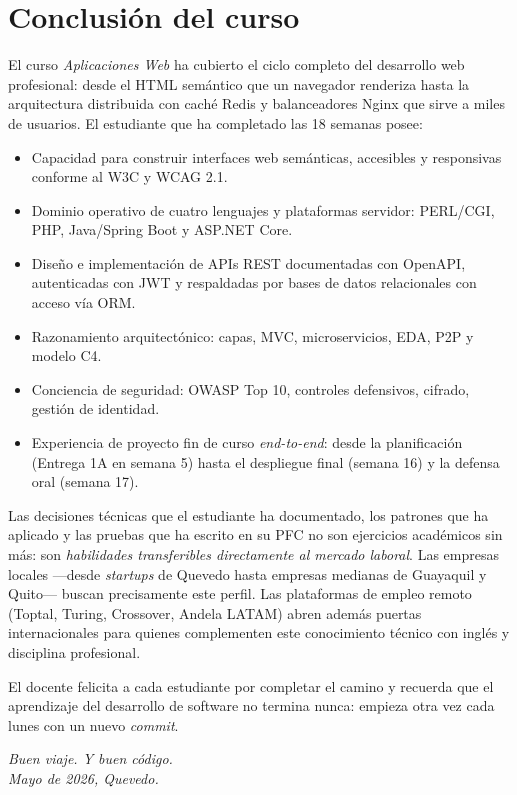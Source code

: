 \section{Conclusión del curso}

El curso \emph{Aplicaciones Web} ha cubierto el ciclo completo del
desarrollo web profesional: desde el HTML semántico que un navegador
renderiza hasta la arquitectura distribuida con caché Redis y
balanceadores Nginx que sirve a miles de usuarios. El estudiante que
ha completado las 18 semanas posee:

\begin{itemize}
\item Capacidad para construir interfaces web semánticas, accesibles
y responsivas conforme al W3C y WCAG 2.1.
\item Dominio operativo de cuatro lenguajes y plataformas servidor:
PERL/CGI, PHP, Java/Spring Boot y ASP.NET Core.
\item Diseño e implementación de APIs REST documentadas con OpenAPI,
autenticadas con JWT y respaldadas por bases de datos relacionales
con acceso vía ORM.
\item Razonamiento arquitectónico: capas, MVC, microservicios, EDA,
P2P y modelo C4.
\item Conciencia de seguridad: OWASP Top 10, controles defensivos,
cifrado, gestión de identidad.
\item Experiencia de proyecto fin de curso \emph{end-to-end}: desde
la planificación (Entrega 1A en semana 5) hasta el despliegue final
(semana 16) y la defensa oral (semana 17).
\end{itemize}

Las decisiones técnicas que el estudiante ha documentado, los patrones
que ha aplicado y las pruebas que ha escrito en su PFC no son
ejercicios académicos sin más: son \emph{habilidades transferibles
directamente al mercado laboral}. Las empresas locales ---desde
\emph{startups} de Quevedo hasta empresas medianas de Guayaquil y
Quito--- buscan precisamente este perfil. Las plataformas de empleo
remoto (Toptal, Turing, Crossover, Andela LATAM) abren además puertas
internacionales para quienes complementen este conocimiento técnico
con inglés y disciplina profesional.

El docente felicita a cada estudiante por completar el camino y
recuerda que el aprendizaje del desarrollo de software no termina
nunca: empieza otra vez cada lunes con un nuevo \emph{commit}.

\hfill \emph{Buen viaje. Y buen código.}\\
\hfill \emph{Mayo de 2026, Quevedo.}

